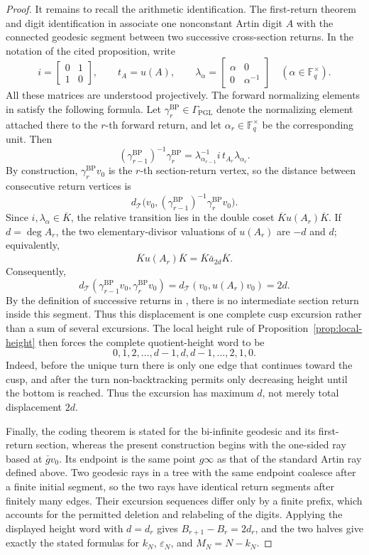 \documentclass[11pt]{amsart}
\theoremstyle{definition}
\theoremstyle{plain}
\newcommand{\Fq}{\mathbb F_q}
\newcommand{\GammaP}{\Gamma_{\mathrm{PGL}}}
\newcommand{\bK}{\overline K}
\newcommand{\Tree}{\mathcal T}
\begin{document}
\begin{proof}
It remains to recall the arithmetic identification.  The first-return theorem
and digit identification in
\cite[Theorem~3.2 and Proposition~3.5]{BroisePaulin2007} associate one
nonconstant Artin digit \(A\) with the connected geodesic segment between two
successive cross-section returns.  In the notation of the cited proposition,
write
\[
i=\begin{bmatrix}0&1\\1&0\end{bmatrix},\qquad
t_A=u(A),\qquad
\lambda_\alpha=
 \begin{bmatrix}\alpha&0\\0&\alpha^{-1}\end{bmatrix}
 \quad(\alpha\in\Fq^\times).
\]
All these matrices are understood projectively.  The forward normalizing
elements in \cite[Proposition~3.5]{BroisePaulin2007} satisfy the following
formula.  Let \(\gamma_r^{\mathrm{BP}}\in\GammaP\) denote the normalizing
element attached there to the \(r\)-th forward return, and let
\(\alpha_r\in\Fq^\times\) be the corresponding unit.  Then
\[
(\gamma_{r-1}^{\mathrm{BP}})^{-1}\gamma_r^{\mathrm{BP}}
 =\lambda_{\alpha_{r-1}}^{-1}i\,t_{A_r}\lambda_{\alpha_r}.
\]
By construction, \(\gamma_r^{\mathrm{BP}}v_0\) is the \(r\)-th section-return
vertex, so the distance between consecutive return vertices is
\[
d_\Tree\bigl(v_0,
 (\gamma_{r-1}^{\mathrm{BP}})^{-1}\gamma_r^{\mathrm{BP}}v_0\bigr).
\]
Since \(i,\lambda_\alpha\in\bK\), the relative transition lies in the double
coset \(\bK u(A_r)\bK\).  If \(d=\deg A_r\), the two elementary-divisor
valuations of \(u(A_r)\) are \(-d\) and \(d\); equivalently,
\[
\bK u(A_r)\bK=\bK\bar a_{2d}\bK.
\]
Consequently,
\[
d_{\Tree}(\gamma_{r-1}^{\mathrm{BP}}v_0,
          \gamma_r^{\mathrm{BP}}v_0)
 =d_{\Tree}(v_0,u(A_r)v_0)=2d.
\]
By the definition of successive returns in
\cite[Theorem~3.2]{BroisePaulin2007}, there is no intermediate section return
inside this segment.  Thus this displacement is one complete cusp excursion
rather than a sum of several excursions.  The local height rule of
Proposition~\ref{prop:local-height} then forces the complete quotient-height
word to be
\[
0,1,2,\ldots,d-1,d,d-1,\ldots,2,1,0.
\]
Indeed, before the unique turn there is only one edge that continues toward
the cusp, and after the turn non-backtracking permits only decreasing height
until the bottom is reached.  Thus the excursion has maximum \(d\), not merely
total displacement \(2d\).

Finally, the coding theorem is stated for the bi-infinite geodesic and its
first-return section, whereas the present construction begins with the
one-sided ray based at \(\bar g v_0\).  Its endpoint is the same point
\(g\infty\) as that of the standard Artin ray defined above.  Two geodesic rays
in a tree with the same endpoint coalesce after a finite initial segment, so
the two rays have identical return segments after finitely many edges.  Their
excursion sequences differ only by a finite prefix, which accounts for the
permitted deletion and relabeling of the digits.  Applying the displayed
height word with \(d=d_r\) gives
\(B_{r+1}-B_r=2d_r\), and the two halves give exactly the stated formulas for
\(k_N\), \(\varepsilon_N\), and \(M_N=N-k_N\).
\end{proof}
\end{document}
